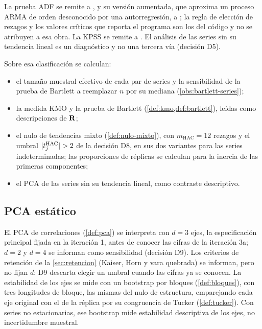 La prueba ADF se remite a \textcite{dickey_fuller_1979}, y su
versión aumentada, que aproxima un proceso ARMA de orden desconocido por una autorregresión, a
\textcite{said_dickey_1984}; la regla de elección de rezagos y los valores críticos que reporta el
programa son los del código y no se atribuyen a esa obra. La KPSS se remite a
\textcite{kwiatkowski_et_al_1992}. El análisis de las
series sin su tendencia lineal es un diagnóstico y no una tercera vía (decisión D5).

Sobre esa clasificación se calculan:

\begin{itemize}[leftmargin=*]
  \item el tamaño muestral efectivo de cada par de series y la sensibilidad de la prueba de
    Bartlett a reemplazar $n$ por su mediana (\cref{obs:bartlett-series});
  \item la medida KMO y la prueba de Bartlett (\cref{def:kmo,def:bartlett}), leídas como
    descripciones de $\mathbf{R}$;
  \item el nulo de tendencias mixto (\cref{def:nulo-mixto}), con $m_{\mathrm{HAC}}=12$ rezagos y el
    umbral $\lvert t^{\mathrm{HAC}}_j\rvert>2$ de la decisión D8, en sus dos variantes para las series
    indeterminadas; las proporciones de réplicas se calculan para la inercia de las primeras
    componentes;
  \item el PCA de las series sin su tendencia lineal, como contraste descriptivo.
\end{itemize}

\subsection{PCA estático}
\label{sec:met-pca}

El PCA de correlaciones (\cref{def:pca}) se interpreta con $d=3$ ejes, la especificación principal
fijada en la iteración 1, antes de conocer las cifras de la iteración 3a; $d=2$ y $d=4$ se informan
como sensibilidad (decisión D9). Los criterios de retención de la \cref{sec:retencion} (Kaiser,
Horn y vara quebrada) se informan, pero no fijan $d$: D9 descarta elegir un umbral cuando las
cifras ya se conocen. La estabilidad de los ejes se mide con un bootstrap por bloques
(\cref{def:bloques}), con tres longitudes de bloque, las mismas del nulo de estructura, emparejando
cada eje original con el de la réplica por su congruencia de Tucker (\cref{def:tucker}). Con
series no estacionarias, ese bootstrap mide estabilidad descriptiva de los ejes, no incertidumbre
muestral.

